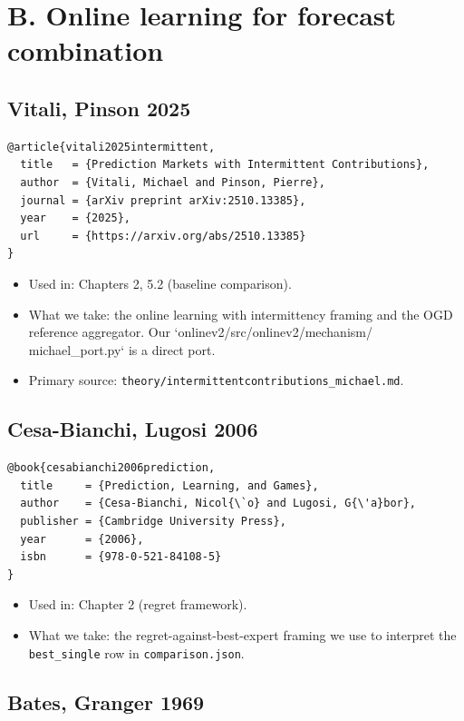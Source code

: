 \documentclass[11pt,a4paper,openany]{report}
\begin{document}
\section{B. Online learning for forecast combination}

\subsection{Vitali, Pinson 2025}

\begin{verbatim}
@article{vitali2025intermittent,
  title   = {Prediction Markets with Intermittent Contributions},
  author  = {Vitali, Michael and Pinson, Pierre},
  journal = {arXiv preprint arXiv:2510.13385},
  year    = {2025},
  url     = {https://arxiv.org/abs/2510.13385}
}
\end{verbatim}

\begin{itemize}
  \item Used in: Chapters 2, 5.2 (baseline comparison).
  \item What we take: the online learning with intermittency framing and the
    OGD reference aggregator. Our `onlinev2/src/onlinev2/mechanism/
    michael\_port.py` is a direct port.
  \item Primary source: \texttt{theory/intermittentcontributions\_michael.md}.
\end{itemize}

\subsection{Cesa-Bianchi, Lugosi 2006}

\begin{verbatim}
@book{cesabianchi2006prediction,
  title     = {Prediction, Learning, and Games},
  author    = {Cesa-Bianchi, Nicol{\`o} and Lugosi, G{\'a}bor},
  publisher = {Cambridge University Press},
  year      = {2006},
  isbn      = {978-0-521-84108-5}
}
\end{verbatim}

\begin{itemize}
  \item Used in: Chapter 2 (regret framework).
  \item What we take: the regret-against-best-expert framing we use to
    interpret the \texttt{best\_single} row in \texttt{comparison.json}.
\end{itemize}

\subsection{Bates, Granger 1969}
\end{document}
